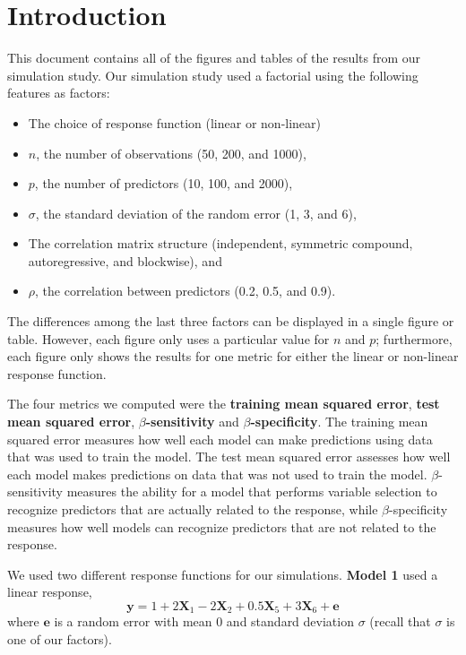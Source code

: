 \documentclass{article}
\begin{document}
\tableofcontents

\newpage
\section{Introduction}

This document contains all of the figures and tables of the results from our simulation study. Our simulation study used a factorial using the following features as factors:
\begin{itemize}
	\item The choice of response function (linear or non-linear)
	\item $n$, the number of observations (50, 200, and 1000),
	\item $p$, the number of predictors (10, 100, and 2000),
	\item $\sigma$, the standard deviation of the random error (1, 3, and 6),
	\item The correlation matrix structure (independent, symmetric compound, autoregressive, and blockwise), and
	\item $\rho$, the correlation between predictors (0.2, 0.5, and 0.9).
\end{itemize}
The differences among the last three factors can be displayed in a single figure or table. However, each figure only uses a particular value for $n$ and $p$; furthermore, each figure only shows the results for one metric for either the linear or non-linear response function.

The four metrics we computed were the \textbf{training mean squared error}, \textbf{test mean squared error}, \textbf{$\beta$-sensitivity} and \textbf{$\beta$-specificity}. The training mean squared error measures how well each model can make predictions using data that was used to train the model. The test mean squared error assesses how well each model makes predictions on data that was not used to train the model. $\beta$-sensitivity measures the ability for a model that performs variable selection to recognize predictors that are actually related to the response, while $\beta$-specificity measures how well models can recognize predictors that are not related to the response.

We used two different response functions for our simulations. \textbf{Model 1} used a linear response,
\begin{equation}\label{eqn:linear-response}
	\mathbf{y} = 1 + 2\mathbf{X}_1 - 2\mathbf{X}_2 + 0.5\mathbf{X}_5 + 3\mathbf{X}_6 + \mathbf{e}
\end{equation}
where $\mathbf{e}$ is a random error with mean 0 and standard deviation $\sigma$ (recall that $\sigma$ is one of our factors).
\end{document}
